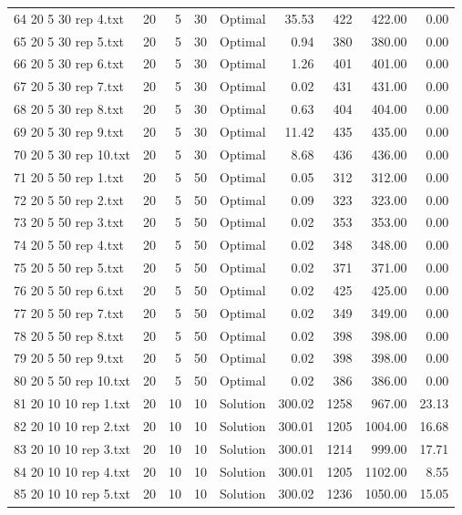 \begin{longtable}{lrrllrrrr}
64 20 5 30 rep 4.txt & 20 & 5 & 30 & Optimal & 35.53 & 422 & 422.00 &  0.00\\
65 20 5 30 rep 5.txt & 20 & 5 & 30 & Optimal &  0.94 & 380 & 380.00 &  0.00\\
66 20 5 30 rep 6.txt & 20 & 5 & 30 & Optimal &  1.26 & 401 & 401.00 &  0.00\\
67 20 5 30 rep 7.txt & 20 & 5 & 30 & Optimal &  0.02 & 431 & 431.00 &  0.00\\
68 20 5 30 rep 8.txt & 20 & 5 & 30 & Optimal &  0.63 & 404 & 404.00 &  0.00\\
69 20 5 30 rep 9.txt & 20 & 5 & 30 & Optimal & 11.42 & 435 & 435.00 &  0.00\\
70 20 5 30 rep 10.txt & 20 & 5 & 30 & Optimal &  8.68 & 436 & 436.00 &  0.00\\
71 20 5 50 rep 1.txt & 20 & 5 & 50 & Optimal &  0.05 & 312 & 312.00 &  0.00\\
72 20 5 50 rep 2.txt & 20 & 5 & 50 & Optimal &  0.09 & 323 & 323.00 &  0.00\\
73 20 5 50 rep 3.txt & 20 & 5 & 50 & Optimal &  0.02 & 353 & 353.00 &  0.00\\
74 20 5 50 rep 4.txt & 20 & 5 & 50 & Optimal &  0.02 & 348 & 348.00 &  0.00\\
75 20 5 50 rep 5.txt & 20 & 5 & 50 & Optimal &  0.02 & 371 & 371.00 &  0.00\\
76 20 5 50 rep 6.txt & 20 & 5 & 50 & Optimal &  0.02 & 425 & 425.00 &  0.00\\
77 20 5 50 rep 7.txt & 20 & 5 & 50 & Optimal &  0.02 & 349 & 349.00 &  0.00\\
78 20 5 50 rep 8.txt & 20 & 5 & 50 & Optimal &  0.02 & 398 & 398.00 &  0.00\\
79 20 5 50 rep 9.txt & 20 & 5 & 50 & Optimal &  0.02 & 398 & 398.00 &  0.00\\
80 20 5 50 rep 10.txt & 20 & 5 & 50 & Optimal &  0.02 & 386 & 386.00 &  0.00\\
81 20 10 10 rep 1.txt & 20 & 10 & 10 & Solution & 300.02 & 1258 & 967.00 & 23.13\\
82 20 10 10 rep 2.txt & 20 & 10 & 10 & Solution & 300.01 & 1205 & 1004.00 & 16.68\\
83 20 10 10 rep 3.txt & 20 & 10 & 10 & Solution & 300.01 & 1214 & 999.00 & 17.71\\
84 20 10 10 rep 4.txt & 20 & 10 & 10 & Solution & 300.01 & 1205 & 1102.00 &  8.55\\
85 20 10 10 rep 5.txt & 20 & 10 & 10 & Solution & 300.02 & 1236 & 1050.00 & 15.05\\

\end{longtable}
